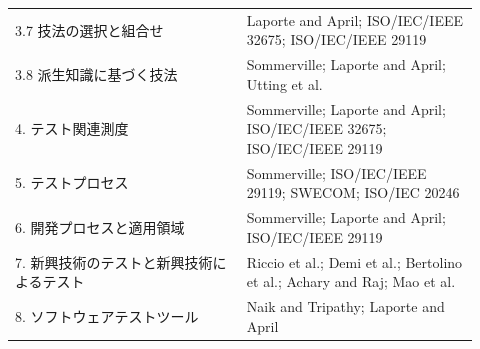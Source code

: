 \documentclass[uplatex,dvipdfmx,a4paper,11pt,nomag]{jsarticle}
\begin{document}
\begin{longtable}{P{0.46\linewidth}P{0.46\linewidth}}
3.7 技法の選択と組合せ & Laporte and April; ISO/IEC/IEEE 32675; ISO/IEC/IEEE 29119 \\
3.8 派生知識に基づく技法 & Sommerville; Laporte and April; Utting et al. \\
4. テスト関連測度 & Sommerville; Laporte and April; ISO/IEC/IEEE 32675; ISO/IEC/IEEE 29119 \\
5. テストプロセス & Sommerville; ISO/IEC/IEEE 29119; SWECOM; ISO/IEC 20246 \\
6. 開発プロセスと適用領域 & Sommerville; Laporte and April; ISO/IEC/IEEE 29119 \\
7. 新興技術のテストと新興技術によるテスト & Riccio et al.; Demi et al.; Bertolino et al.; Achary and Raj; Mao et al. \\
8. ソフトウェアテストツール & Naik and Tripathy; Laporte and April \\
\bottomrule
\end{longtable}
\end{document}
